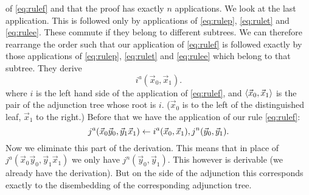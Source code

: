 of \eqref{eq:rulef} and that the proof has exactly $n$ applications.
We look at the last application. This is followed only by
applications of \eqref{eq:rulep}, \eqref{eq:rulet} and 
\eqref{eq:rulee}. These commute if they belong to different 
subtrees. We can therefore rearrange the order such that our 
application of \eqref{eq:rulef} is followed exactly by those 
applications of \eqref{eq:rulep}, \eqref{eq:rulet} and 
\eqref{eq:rulee} which belong to that subtree. They derive
\begin{equation}
i^a(\vec{x}_0, \vec{x}_1).
\end{equation}
where $i$ is the left hand side of the application of \eqref{eq:rulef}, 
and $\langle \vec{x}_0, \vec{x}_1\rangle$ is the pair of the adjunction
tree whose root is $i$. ($\vec{x}_0$ is to the left of the
distinguished leaf, $\vec{x}_1$ to the right.)
Before that we have the application of our rule \eqref{eq:rulef}:
\begin{equation}
j^a(\vec{x}_0\vec{y}_0,\vec{y}_1\vec{x}_1) \leftarrow
i^a(\vec{x}_0, \vec{x}_1), j^n(\vec{y}_0,\vec{y}_1).
\end{equation}
Now we eliminate this part of the derivation. This means that in place
of $j^a(\vec{x}_0\vec{y}_0, \vec{y}_1\vec{x}_1)$ we only have
$j^n(\vec{y}_0, \vec{y}_1)$. This however is derivable (we
already have the derivation). But on the side of the adjunction
this corresponds exactly to the disembedding of the corresponding
adjunction tree.
\proofend

